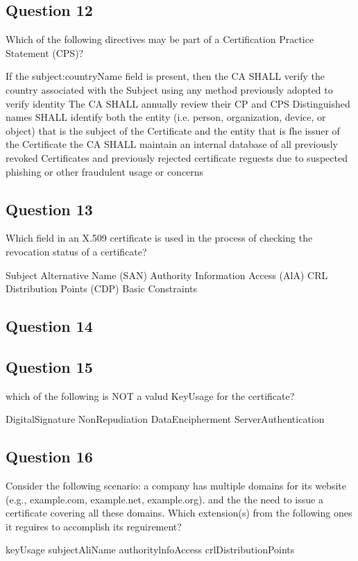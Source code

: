 \subsection*{Question 12}
Which of the following directives may be part of a Certification Practice Statement (CPS)?
\begin{itemize}
  \correct If the subject:countryName field is present, then the CA SHALL verify the country associated with the Subject using any method previously adopted to verify identity
  \correct The CA SHALL annually review their CP and CPS
  \correct Distinguished names SHALL identify both the entity (i.e. person, organization, device, or object) that is the subject of the Certificate and the entity that is fhe issuer of the Certificate
  \correct the CA SHALL maintain an internal database of all previously revoked Certificates and previously rejected certificate reguests due to suspected phishing or other fraudulent usage or concerns
\end{itemize}

\subsection*{Question 13}
Which field in an X.509 certificate is used in the process of checking the revocation status of a certificate?
\begin{itemize}
  \incorrect Subject Alternative Name (SAN) 
  \correct Authority Information Access (AlA) 
  \correct CRL Distribution Points (CDP) 
  \incorrect Basic Constraints
\end{itemize}

\subsection*{Question 14}

\subsection*{Question 15}
which of the following is NOT a valud KeyUsage for the certificate?
\begin{itemize}
  \incorrect DigitalSignature
  \incorrect NonRepudiation 
  \incorrect DataEncipherment 
  \correct ServerAuthentication
\end{itemize}
\subsection*{Question 16}
Consider the following scenario: a company has multiple domains for its website
(e.g., example.com, example.net, example.org). and the the need to issue a
certificate covering all these domains. Which extension(s) from the following
ones it reguires to accomplish its reguirement?
\begin{itemize}
  \incorrect keyUsage
  \correct subjectAliName 
  \incorrect authoritylnfoAccess 
  \incorrect crlDistributionPoints
\end{itemize}
